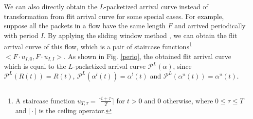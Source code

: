 \documentclass[10pt,journal]{IEEEtran}
\begin{document}
We can also directly obtain the $L$-packetized arrival curve instead of transformation from flit arrival curve for some special cases. For example, suppose all the packets in a flow have the same length $F$ and arrived periodically with period $I$. By applying the sliding window method \cite{1253607}, we can obtain the flit arrival curve of this flow, which is a pair of staircase functions\footnote{A staircase function $u_{T,\tau}=\lceil\frac{t+\tau}{T}\rceil$ for $t>0$ and 0 otherwise, where $0\leq \tau\leq T$ and $\lceil\cdot\rceil$ is the ceiling operator.} $<F\cdot u_{I,0},F\cdot u_{I,I}>$. As shown in Fig. \ref{perio}, the obtained flit arrival curve which is equal to the $L$-packetized arrival curve $\mathcal{P}^L(\alpha)$, since $\mathcal{P}^L(R(t))=R(t)$, $\mathcal{P}^L(\alpha^l(t))=\alpha^l(t)$ and $\mathcal{P}^L(\alpha^u(t))=\alpha^u(t)$.
\begin{figure}
  \centering
  \hspace{10pt}

\end{figure}
\end{document}
